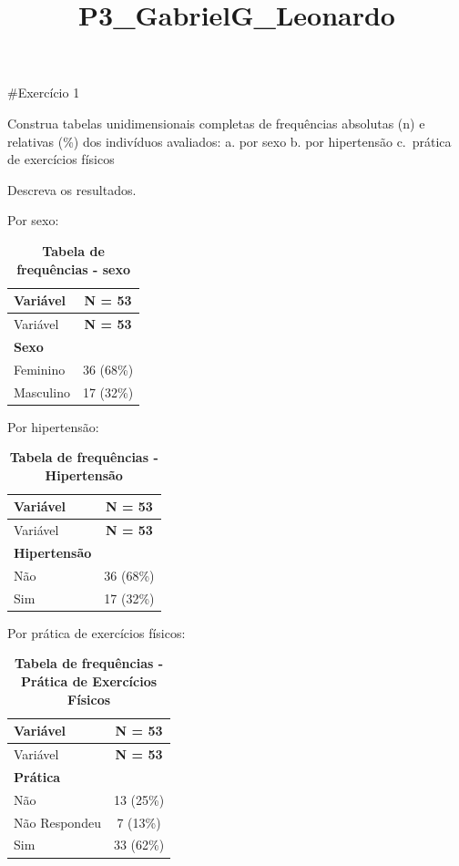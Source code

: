 \documentclass[
  letterpaper,
  DIV=11,
  numbers=noendperiod]{scrartcl}
\title{P3\_GabrielG\_Leonardo}
\author{}
\date{}
\begin{document}
\maketitle
\ifdefined\Shaded\renewenvironment{Shaded}{\begin{tcolorbox}[interior hidden, frame hidden, enhanced, sharp corners, boxrule=0pt, breakable, borderline west={3pt}{0pt}{shadecolor}]}{\end{tcolorbox}}\fi

\#Exercício 1

Construa tabelas unidimensionais completas de frequências absolutas (n)
e relativas (\%) dos indivíduos avaliados: a. por sexo b. por
hipertensão c.~prática de exercícios físicos

Descreva os resultados.

Por sexo:

\begin{longtable}[]{@{}lc@{}}
\caption{\textbf{Tabela de frequências - sexo}}\tabularnewline
\toprule()
Variável & \textbf{N = 53} \\
\midrule()
\endfirsthead
\toprule()
Variável & \textbf{N = 53} \\
\midrule()
\endhead
\textbf{Sexo} & \\
Feminino & 36 (68\%) \\
Masculino & 17 (32\%) \\
\bottomrule()
\end{longtable}

Por hipertensão:

\begin{longtable}[]{@{}lc@{}}
\caption{\textbf{Tabela de frequências - Hipertensão}}\tabularnewline
\toprule()
Variável & \textbf{N = 53} \\
\midrule()
\endfirsthead
\toprule()
Variável & \textbf{N = 53} \\
\midrule()
\endhead
\textbf{Hipertensão} & \\
Não & 36 (68\%) \\
Sim & 17 (32\%) \\
\bottomrule()
\end{longtable}

Por prática de exercícios físicos:

\begin{longtable}[]{@{}lc@{}}
\caption{\textbf{Tabela de frequências - Prática de Exercícios
Físicos}}\tabularnewline
\toprule()
Variável & \textbf{N = 53} \\
\midrule()
\endfirsthead
\toprule()
Variável & \textbf{N = 53} \\
\midrule()
\endhead
\textbf{Prática} & \\
Não & 13 (25\%) \\
Não Respondeu & 7 (13\%) \\
Sim & 33 (62\%) \\
\bottomrule()
\end{longtable}
\end{document}
